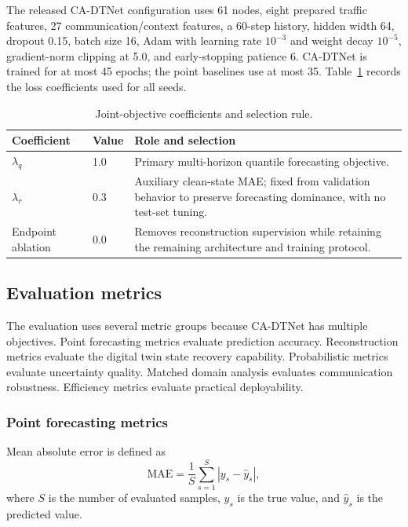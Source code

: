 \documentclass[pdflatex,sn-mathphys-num]{sn-jnl}%
\newenvironment{changed}{}{}
\theoremstyle{thmstyleone}%
\theoremstyle{thmstyletwo}%
\theoremstyle{thmstylethree}%
\begin{document}
\begin{changed}
The released CA-DTNet configuration uses 61 nodes, eight prepared traffic features, 27 communication/context features, a 60-step history, hidden width 64, dropout 0.15, batch size 16, Adam with learning rate \(10^{-3}\) and weight decay \(10^{-5}\), gradient-norm clipping at 5.0, and early-stopping patience 6. CA-DTNet is trained for at most 45 epochs; the point baselines use at most 35. Table~\ref{tab:loss_weights} records the loss coefficients used for all seeds.

\begin{table}[!htbp]
\caption{Joint-objective coefficients and selection rule.}
\label{tab:loss_weights}
\centering
\small
\begin{tabular}{p{2.7cm}p{1.7cm}p{7.0cm}}
\toprule
Coefficient & Value & Role and selection \\
\midrule
\(\lambda_q\) & 1.0 & Primary multi-horizon quantile forecasting objective. \\
\(\lambda_r\) & 0.3 & Auxiliary clean-state MAE; fixed from validation behavior to preserve forecasting dominance, with no test-set tuning. \\
Endpoint ablation & 0.0 & Removes reconstruction supervision while retaining the remaining architecture and training protocol. \\
\bottomrule
\end{tabular}
\end{table}
\end{changed}

\subsection{Evaluation metrics}
\label{subsec:evaluation_metrics}

The evaluation uses several metric groups because CA-DTNet has multiple objectives. Point forecasting metrics evaluate prediction accuracy. Reconstruction metrics evaluate the digital twin state recovery capability. Probabilistic metrics evaluate uncertainty quality. Matched domain analysis evaluates communication robustness. Efficiency metrics evaluate practical deployability.

\subsubsection{Point forecasting metrics}

Mean absolute error is defined as
\begin{equation}
    \mathrm{MAE}
    =
    \frac{1}{S}
    \sum_{s=1}^{S}
    \left|
    y_s - \widehat{y}_s
    \right|,
\end{equation}
where \(S\) is the number of evaluated samples, \(y_s\) is the true value, and \(\widehat{y}_s\) is the predicted value.
\end{document}
